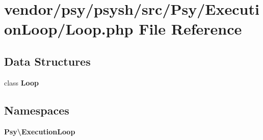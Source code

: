 \section{vendor/psy/psysh/src/\+Psy/\+Execution\+Loop/\+Loop.php File Reference}
\label{_loop_8php}
\subsection*{Data Structures}
\begin{DoxyCompactItemize}
\item 
class {\bf Loop}
\end{DoxyCompactItemize}
\subsection*{Namespaces}
\begin{DoxyCompactItemize}
\item 
 {\bf Psy\textbackslash{}\+Execution\+Loop}
\end{DoxyCompactItemize}
